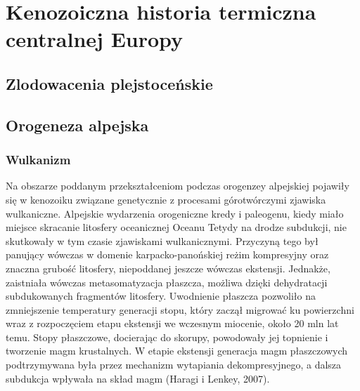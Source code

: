 \documentclass[11.5pt,twoside]{report}
\begin{document}
	
	\tableofcontents
	
	\chapter{Kenozoiczna historia termiczna centralnej Europy}
	
	\section{Zlodowacenia plejstoceńskie}
	
	\section{Orogeneza alpejska}
	
	\subsection{Wulkanizm}
	
Na obszarze poddanym przekształceniom podczas orogenzey alpejskiej pojawiły się w kenozoiku związane genetycznie z procesami górotwórczymi zjawiska wulkaniczne. Alpejskie wydarzenia orogeniczne kredy i paleogenu, kiedy miało miejsce skracanie litosfery oceanicznej Oceanu Tetydy na drodze subdukcji, nie skutkowały w tym czasie zjawiskami wulkanicznymi. Przyczyną tego był panujący wówczas w domenie karpacko-panońskiej reżim kompresyjny oraz znaczna grubość litosfery, niepoddanej jeszcze wówczas ekstensji. Jednakże, zaistniała wówczas metasomatyzacja płaszcza, możliwa dzięki dehydratacji subdukowanych fragmentów litosfery. Uwodnienie płaszcza pozwoliło na zmniejszenie temperatury generacji stopu, który zaczął migrować ku powierzchni wraz z rozpoczęciem etapu ekstensji we wczesnym miocenie, około 20 mln lat temu. Stopy płaszczowe, docierając do skorupy, powodowały jej topnienie i tworzenie magm krustalnych. W etapie ekstensji generacja magm płaszczowych podtrzymywana była przez mechanizm wytapiania dekompresyjnego, a dalsza subdukcja wpływała na skład magm (Haragi i Lenkey, 2007).

\end{document}
